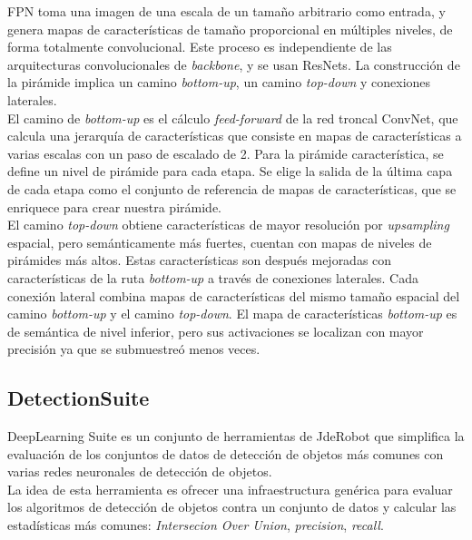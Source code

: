 \documentclass{bmvc2k}
\begin{document}
FPN toma una imagen de una escala de un tamaño arbitrario como entrada, y genera mapas de características de tamaño proporcional en múltiples niveles, de forma totalmente convolucional. Este proceso es independiente de las arquitecturas convolucionales de \textit{backbone}, y se usan ResNets. La construcción de la pirámide implica un camino \textit{bottom-up}, un camino \textit{top-down} y conexiones laterales.\\

El camino de \textit{bottom-up} es el cálculo \textit{feed-forward} de la red troncal ConvNet, que calcula una jerarquía de características que consiste en mapas de características a varias escalas con un paso de escalado de 2. Para la pirámide característica, se define un nivel de pirámide para cada etapa. Se elige la salida de la última capa de cada etapa como el conjunto de referencia de mapas de características, que se enriquece para crear nuestra pirámide.\\

El camino \textit{top-down} obtiene características de mayor resolución por \textit{upsampling} espacial, pero semánticamente más fuertes, cuentan con mapas de niveles de pirámides más altos. Estas características son después mejoradas con características de la ruta \textit{bottom-up} a través de conexiones laterales. Cada conexión lateral combina mapas de características del mismo tamaño espacial del camino \textit{bottom-up} y el camino \textit{top-down}. El mapa de características \textit{bottom-up} es de semántica de nivel inferior, pero sus activaciones se localizan con mayor precisión ya que se submuestreó menos veces.\\

\subsection{DetectionSuite}

DeepLearning Suite es un conjunto de herramientas de JdeRobot que simplifica la evaluación de los conjuntos de datos de detección de objetos más comunes con varias redes neuronales de detección de objetos.\\

La idea de esta herramienta es ofrecer una infraestructura genérica para evaluar los algoritmos de detección de objetos contra un conjunto de datos y calcular las estadísticas más comunes: \textit{Intersecion Over Union}, \textit{precision}, \textit{recall}.\\
\end{document}
